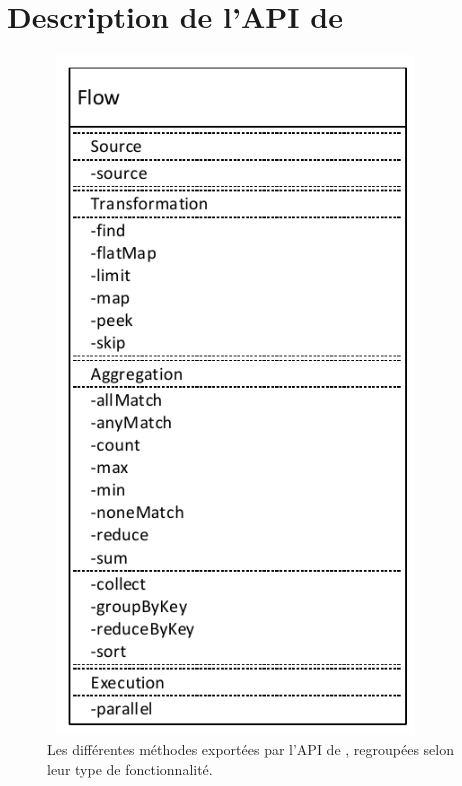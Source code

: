 
\chapter{Description de l'API de \PpFf}
\label{description.chap}





\begin{figure}
\centering
     \includegraphics[height=18cm, width=10cm]{Figures/MethodsAPI.pdf}
      \caption{Les diff\'erentes m\'ethodes export\'ees par l'{API} de \ppff,
     regroup\'ees selon leur type de fonctionnalit\'e.}
       \label{MethodesAPI.fig}
\end{figure}



